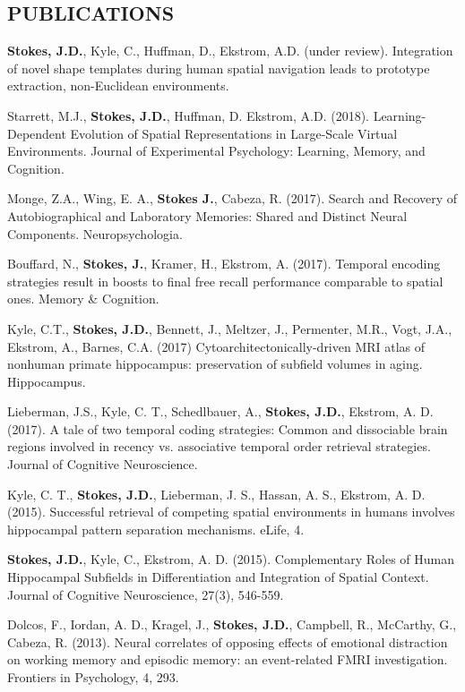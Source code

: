 \documentclass[line,margin,10pt]{res}
\begin{document}
\begin{resume}
\section{PUBLICATIONS}

\textbf{Stokes, J.D.}, Kyle, C., Huffman, D., Ekstrom, A.D. (under review). Integration of novel shape templates during human spatial navigation leads to prototype extraction, non-Euclidean environments.

Starrett, M.J., \textbf{Stokes, J.D.}, Huffman, D. Ekstrom, A.D. (2018). Learning-Dependent Evolution of Spatial Representations in Large-Scale Virtual Environments. Journal of Experimental Psychology: Learning, Memory, and Cognition.

Monge, Z.A., Wing, E. A., \textbf{Stokes J.}, Cabeza, R. (2017). Search and Recovery of Autobiographical and Laboratory Memories: Shared and Distinct Neural Components. Neuropsychologia.

Bouffard, N., \textbf{Stokes, J.}, Kramer, H., Ekstrom, A. (2017). Temporal encoding strategies result in boosts to final free recall performance comparable to spatial ones. Memory \& Cognition.

Kyle, C.T., \textbf{Stokes, J.D.}, Bennett, J., Meltzer, J., Permenter, M.R., Vogt, J.A., Ekstrom, A., Barnes, C.A. (2017) Cytoarchitectonically-driven MRI atlas of nonhuman primate hippocampus:  preservation of subfield volumes in aging. Hippocampus. 

Lieberman, J.S., Kyle, C. T., Schedlbauer, A., \textbf{Stokes, J.D.}, Ekstrom, A. D. (2017). A tale of two temporal coding strategies: Common and dissociable brain regions involved in recency vs. associative temporal order retrieval strategies. Journal of Cognitive Neuroscience.

Kyle, C. T., \textbf{Stokes, J.D.}, Lieberman, J. S., Hassan, A. S., Ekstrom, A. D. (2015). Successful retrieval of competing spatial environments in humans involves hippocampal pattern separation mechanisms. eLife, 4. 

\textbf{Stokes, J.D.}, Kyle, C., Ekstrom, A. D. (2015). Complementary Roles of Human Hippocampal Subfields in Differentiation and Integration of Spatial Context. Journal of Cognitive Neuroscience, 27(3), 546-559. 

Dolcos, F., Iordan, A. D., Kragel, J., \textbf{Stokes, J.D.}, Campbell, R., McCarthy, G., Cabeza, R. (2013). Neural correlates of opposing effects of emotional distraction on working memory and episodic memory: an event-related FMRI investigation. Frontiers in Psychology, 4, 293. 


\end{resume}
\end{document}
